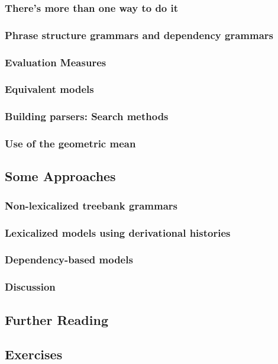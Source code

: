 \documentclass[a4paper]{article}
\begin{document}
\subsubsection{There's more than one way to do it}
\subsubsection{Phrase structure grammars and dependency grammars}
\subsubsection{Evaluation Measures}
\subsubsection{Equivalent models}
\subsubsection{Building parsers: Search methods}
\subsubsection{Use of the geometric mean}
\subsection{Some Approaches}
\subsubsection{Non-lexicalized treebank grammars}
\subsubsection{Lexicalized models using derivational histories}
\subsubsection{Dependency-based models}
\subsubsection{Discussion}
\subsection{Further Reading}
\subsection{Exercises}
\newpage
\end{document}
